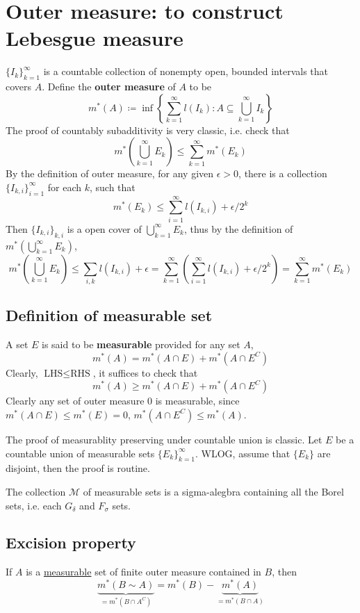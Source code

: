 \section{Outer measure: to construct Lebesgue measure}

$\{ I_k \}_{k=1}^{\infty}$ is a countable collection of nonempty open, bounded intervals that covers $A$. Define the \textbf{outer measure} of $A$ to be
\[
m^{*}(A)\coloneqq \inf \left\{  \sum_{k=1}^{\infty} l(I_k):A\subseteq \bigcup_{k=1}^{\infty} I_k  \right\}
\]
The proof of countably subadditivity is very classic, i.e. check that
\[
m^{*}\left( \bigcup_{k=1}^{\infty} E_k \right)\leq \sum_{k=1}^{\infty} m^{*}(E_k)
\]
By the definition of outer measure, for any given $\epsilon>0$, there is a collection $\{ I_{k,i} \}_{i=1}^{\infty}$ for each $k$, such that
\[
m^{*}(E_k)\leq \sum_{i=1}^{\infty} l(I_{k,i})+\epsilon/2^{k}
\]
Then $\{ I_{k,i} \}_{k,i}$ is a open cover of $\bigcup_{k=1}^{\infty}E_k$, thus by the definition of $m^{*}\left( \bigcup_{k=1}^{\infty}E_k \right)$,
\[
m^{*}\left( \bigcup_{k=1}^{\infty} E_k \right)\leq \sum_{i,k}l(I_{k,i})+\epsilon=\sum_{k=1}^{\infty} \left( \sum_{i=1}^{\infty} l(I_{k,i})+\epsilon/2^{k} \right)=\sum_{k=1}^{\infty} m^{*}(E_k)
\]
\subsection{Definition of measurable set}

A set $E$ is said to be \textbf{measurable} provided for any set $A$,
\[
m^{*}(A)=m^{*}(A\cap E)+m^{*}(A\cap E^{C})
\]
Clearly, $\text{LHS}\leq \text{RHS}$, it suffices to check that
\[
m^{*}(A)\geq m^{*}(A\cap E)+m^{*}(A\cap E^{C})
\]
Clearly any set of outer measure 0 is measurable, since $m^{*}(A\cap E)\leq m^{*}(E)=0$, $m^{*}(A\cap E^{C})\leq m^{*}(A)$.

The proof of measurablity preserving under countable union is classic. Let $E$ be a countable union of measurable sets $\{ E_k \}_{k=1}^{\infty}$. WLOG, assume that $\{ E_k \}$ are disjoint, then the proof is routine.

The collection $\mathcal{M}$ of measurable sets is a sigma-alegbra containing all the Borel sets, i.e. each $G_{\delta}$ and $F_{\sigma}$ sets.

\subsection{Excision property}

If $A$ is a \underline{measurable} set of finite outer measure contained in $B$, then
\[
\underbrace{ m^{*}(B\sim A) }_{ =m^{*}(B\cap A^{C}) }=m^{*}(B)-\underbrace{ m^{*}(A) }_{ =m^{*}(B\cap A) }
\]
